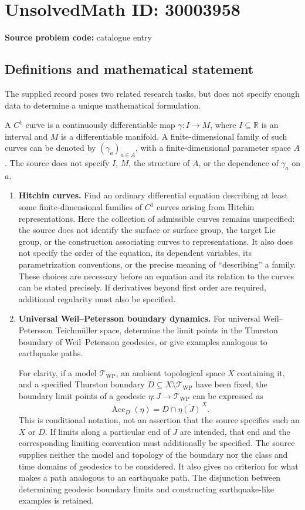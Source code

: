 \documentclass[11pt]{article}
\newcommand{\R}{\mathbb{R}}
\begin{document}
\section*{UnsolvedMath ID: 30003958}
\textbf{Source problem code:} catalogue entry
\subsection{Definitions and mathematical statement}
The supplied record poses two related research tasks, but does not specify enough data to determine a unique mathematical formulation.

A \(C^1\) curve is a continuously differentiable map \(\gamma:I\to M\), where \(I\subseteq\R\) is an interval and \(M\) is a differentiable manifold. A finite-dimensional family of such curves can be denoted by \((\gamma_a)_{a\in A}\), with a finite-dimensional parameter space \(A\). The source does not specify \(I\), \(M\), the structure of \(A\), or the dependence of \(\gamma_a\) on \(a\).

\begin{enumerate}
\item \textbf{Hitchin curves.} Find an ordinary differential equation describing at least some finite-dimensional families of \(C^1\) curves arising from Hitchin representations. Here the collection of admissible curves remains unspecified: the source does not identify the surface or surface group, the target Lie group, or the construction associating curves to representations. It also does not specify the order of the equation, its dependent variables, its parametrization conventions, or the precise meaning of ``describing'' a family. These choices are necessary before an equation and its relation to the curves can be stated precisely. If derivatives beyond first order are required, additional regularity must also be specified.

\item \textbf{Universal Weil--Petersson boundary dynamics.} For universal Weil--Petersson Teichm\"{u}ller space, determine the limit points in the Thurston boundary of Weil--Petersson geodesics, or give examples analogous to earthquake paths.

For clarity, if a model \(\mathcal T_{\mathrm{WP}}\), an ambient topological space \(X\) containing it, and a specified Thurston boundary \(D\subseteq X\setminus\mathcal T_{\mathrm{WP}}\) have been fixed, the boundary limit points of a geodesic \(\eta:J\to\mathcal T_{\mathrm{WP}}\) can be expressed as
\[
\operatorname{Acc}_{D}(\eta)
= D\cap\overline{\eta(J)}^{\,X}.
\]
This is conditional notation, not an assertion that the source specifies such an \(X\) or \(D\). If limits along a particular end of \(J\) are intended, that end and the corresponding limiting convention must additionally be specified. The source supplies neither the model and topology of the boundary nor the class and time domains of geodesics to be considered. It also gives no criterion for what makes a path analogous to an earthquake path. The disjunction between determining geodesic boundary limits and constructing earthquake-like examples is retained.
\end{enumerate}
\end{document}

